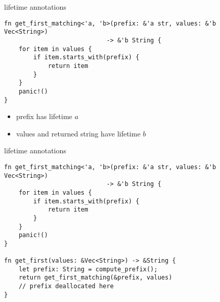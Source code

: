 \begin{frame}[fragile,label=lifetimeAnnot]{lifetime annotations}
    \begin{verbatim}
fn get_first_matching<'a, 'b>(prefix: &'a str, values: &'b Vec<String>)
                            -> &'b String {
    for item in values {
        if item.starts_with(prefix) {
            return item
        }
    }
    panic!()
}
\end{verbatim}
\begin{itemize}
    \item prefix has lifetime $a$
    \item values and returned string have lifetime $b$
\end{itemize}
\end{frame}

\begin{frame}[fragile,label=lifetimeAnnot2]{lifetime annotations}
    \begin{verbatim}
fn get_first_matching<'a, 'b>(prefix: &'a str, values: &'b Vec<String>)
                            -> &'b String {
    for item in values {
        if item.starts_with(prefix) {
            return item
        }
    }
    panic!()
}

fn get_first(values: &Vec<String>) -> &String {
    let prefix: String = compute_prefix();
    return get_first_matching(&prefix, values)
    // prefix deallocated here
}
\end{verbatim}
\end{frame}


